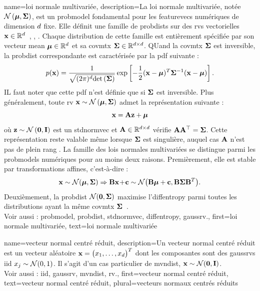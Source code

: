 {name={loi normale multivariée}, 
	description={La loi normale multivariée, 
		notée $\mathcal{N}\left({\bm \mu},{\bf \Sigma}\right)$, est un \gls{probmodel} fondamental 
		pour les \glspl{featurevec} numériques de dimension $d$ fixe. 
		Elle définit une famille de \glspl{probdist} sur des \glspl{rv} vectorielles 
		${\bf x} \in \mathbb{R}^{d}$~\cite{BertsekasProb}, \cite{GrayProbBook}, \cite{Lapidoth09}. 
		Chaque distribution de cette famille est entièrement spécifiée par son vecteur 
		\gls{mean} ${\bm \mu} \in \mathbb{R}^{d}$ et sa 
		\gls{covmtx} ${\bf \Sigma} \in \mathbb{R}^{d \times d}$. 
		QUand la \gls{covmtx} ${\bf \Sigma}$ est inversible, la \gls{probdist} correspondante est caractérisée 
		par la \gls{pdf} suivante :
		\[
		p({\bf x}) = 
		\frac{1}{\sqrt{(2\pi)^{d} {\rm det}\left( {\bf \Sigma} \right)}} 
		\exp\left[ -\frac{1}{2} 
		({\bf x} - {\bm \mu})^T {\bf \Sigma}^{-1} 
		({\bf x} - {\bm \mu}) \right].
		\]
		IL faut noter que cette \gls{pdf} n’est définie que si ${\bf \Sigma}$ est inversible.
		Plus généralement, toute \gls{rv} ${\bf x} \sim \mathcal{N}\left({\bm \mu},{\bf \Sigma}\right)$ 
		admet la représentation suivante :
		\[
		{\bf x} = {\bf A} {\bf z} + {\bm \mu}
		\]
		où ${\bf z} \sim \mathcal{N}\left(\mathbf{0},\mathbf{I}\right)$ est un \gls{stdnormvec} 
		et ${\bf A} \in \mathbb{R}^{d \times d}$ vérifie ${\bf A} {\bf A}^\top = {\bf \Sigma}$. 
		Cette représentation reste valable même lorsque ${\bf \Sigma}$ est singulière, 
		auquel cas ${\bf A}$ n’est pas de plein rang \cite[Ch. 23]{Lapidoth2017}.
		La famille des lois normales multivariées se distingue parmi les \glspl{probmodel} 
		numériques pour au moins deux raisons. 
		Premièrement, elle est stable par transformations affines, c’est-à-dire :
		\[ 
		{\bf x} \sim \mathcal{N}({\bm \mu},{\bf \Sigma}) \Rightarrow 
		{\bf B}{\bf x}\!+\!{\bf c} \sim \mathcal{N}\big( {\bf B}{\bm \mu}+{\bf c},{\bf B} {\bf \Sigma} {\bf B}^{T} \big). 
		\]
		Deuxièmement, la \gls{probdist} $\mathcal{N}(\mathbf{0},{\bf \Sigma})$ maximise 
		l’\gls{diffentropy} parmi toutes les distributions ayant la même \gls{covmtx} 
		${\bf \Sigma}$~\cite{coverthomas}. 
		\\
		Voir aussi : \gls{probmodel}, \gls{probdist}, \gls{stdnormvec}, \gls{diffentropy}, \gls{gaussrv}.}, 
	first={loi normale multivariée},
	text={loi normale multivariée}
}

{name={vecteur normal centré réduit}, 
	description={Un vecteur normal centré réduit est un vecteur aléatoire ${\bf x}=\big(x_{1}, \ldots, x_{d}\big)^{T}$ 
		dont les composantes sont des \glspl{gaussrv} \gls{iid} $x_{j} \sim \mathcal{N}(0,1)$. 
		Il s’agit d’un cas particulier de \gls{mvndist}, ${\bf x} \sim \mathcal{N}(\mathbf{0},\mathbf{I})$.
		\\ 
		Voir aussi : \gls{iid}, \gls{gaussrv}, \gls{mvndist}, \gls{rv}.}, 
	first={vecteur normal centré réduit},
	text={vecteur normal centré réduit}, plural={vecteurs normaux centrés réduits}
}

